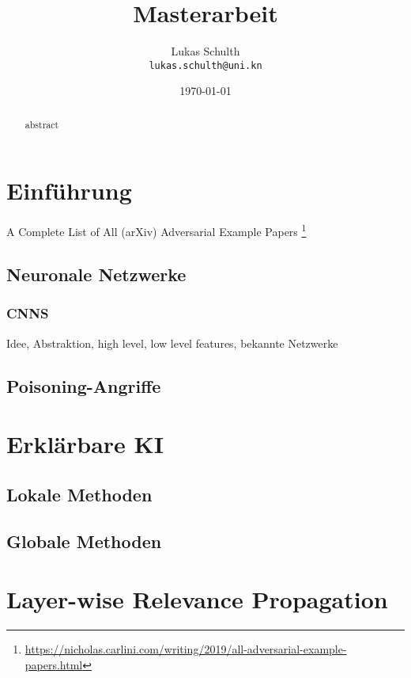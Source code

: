 \documentclass{article}
\title{Masterarbeit}
\author{
	
	Lukas Schulth\\
	\texttt{lukas.schulth@uni.kn}
}
\date{\today}
\theoremstyle{break}
\begin{document}
	\maketitle
	
	\newpage
	\begin{abstract}
		abstract
	\end{abstract}
	\newpage
	
	\listoffigures
	
	\listoftables
	
	\newpage
	\tableofcontents
	\newpage
	

	
	
	
	\section{Einführung}
	
	A Complete List of All (arXiv) Adversarial Example Papers \footnote{\url{https://nicholas.carlini.com/writing/2019/all-adversarial-example-papers.html}}
	
	\subsection{Neuronale Netzwerke}
	
	\subsubsection{CNNS}
	Idee, Abstraktion, high level, low level features, bekannte Netzwerke
	
	
	\subsection{Poisoning-Angriffe}
	
	\section{Erklärbare KI}
	
	\subsection{Lokale Methoden}
	
	\subsection{Globale Methoden}
	
	\section{Layer-wise Relevance Propagation}
\end{document}
